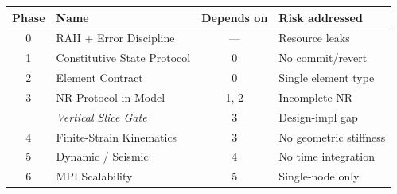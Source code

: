 \begin{center}
\begin{tabular}{clcl}
\toprule
\textbf{Phase} & \textbf{Name} & \textbf{Depends on} & \textbf{Risk addressed} \\
\midrule
0 & RAII + Error Discipline     & ---     & Resource leaks \\
1 & Constitutive State Protocol & 0       & No commit/revert \\
2 & Element Contract            & 0       & Single element type \\
3 & NR Protocol in Model        & 1, 2    & Incomplete NR \\
  & \emph{Vertical Slice Gate}  & 3       & Design-impl gap \\
4 & Finite-Strain Kinematics    & 3       & No geometric stiffness \\
5 & Dynamic / Seismic           & 4       & No time integration \\
6 & MPI Scalability             & 5       & Single-node only \\
\bottomrule
\end{tabular}
\end{center}
